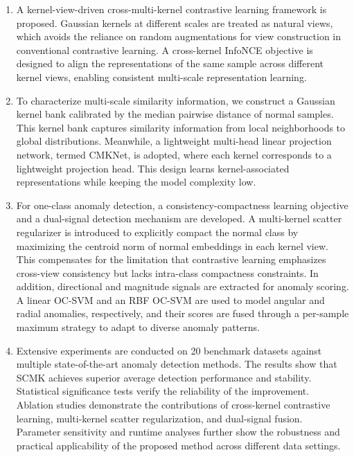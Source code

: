 \documentclass[times, review, 10pt]{elsarticle}
\begin{document}
\begin{enumerate}
  \item A kernel-view-driven cross-multi-kernel contrastive learning framework is proposed. Gaussian kernels at different scales 
  are treated as natural views, which avoids the reliance on random augmentations for view construction in conventional contrastive 
  learning. A cross-kernel InfoNCE objective is designed to align the representations of the same sample across different kernel views, 
  enabling consistent multi-scale representation learning.
  
  \item To characterize multi-scale similarity information, we construct a Gaussian kernel bank calibrated by the median pairwise 
  distance of normal samples. This kernel bank captures similarity information from local neighborhoods to global distributions. 
  Meanwhile, a lightweight multi-head linear projection network, termed CMKNet, is adopted, where each kernel corresponds to a lightweight 
  projection head. This design learns kernel-associated representations while keeping the model complexity low.
  
  \item For one-class anomaly detection, a consistency-compactness learning objective and a dual-signal detection mechanism are developed. 
  A multi-kernel scatter regularizer is introduced to explicitly compact the normal class by maximizing the centroid norm of normal 
  embeddings in each kernel view. This compensates for the limitation that contrastive learning emphasizes cross-view consistency but lacks 
  intra-class compactness constraints. In addition, directional and magnitude signals are extracted for anomaly scoring. A linear OC-SVM 
  and an RBF OC-SVM are used to model angular and radial anomalies, respectively, and their scores are fused through a per-sample maximum 
  strategy to adapt to diverse anomaly patterns.
  
  \item Extensive experiments are conducted on 20 benchmark datasets against multiple state-of-the-art anomaly detection methods. The 
  results show that SCMK achieves superior average detection performance and stability. Statistical significance tests verify the 
  reliability of the improvement. Ablation studies demonstrate the contributions of cross-kernel contrastive learning, multi-kernel scatter 
  regularization, and dual-signal fusion. Parameter sensitivity and runtime analyses further show the robustness and practical 
  applicability of the proposed method across different data settings.
\end{enumerate}
\end{document}
